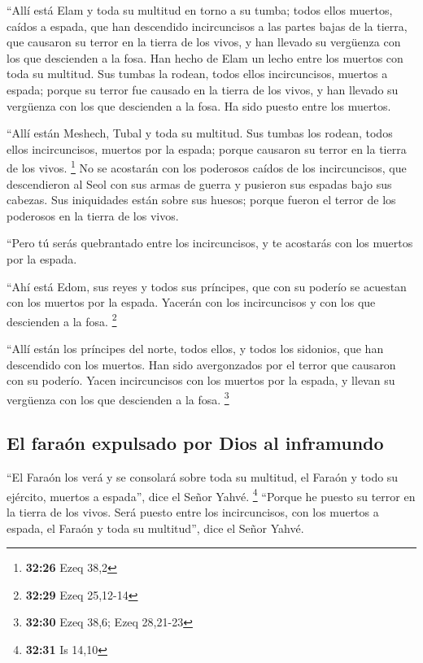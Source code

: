 \begin{paracol}{2}
 ``Allí está Elam y toda su multitud en torno a su tumba;
todos ellos muertos, caídos a espada, que han descendido incircuncisos a
las partes bajas de la tierra, que causaron su terror en la tierra de
los vivos, y han llevado su vergüenza con los que descienden a la fosa.
 Han hecho de Elam un lecho entre los muertos con toda su
multitud. Sus tumbas la rodean, todos ellos incircuncisos, muertos a
espada; porque su terror fue causado en la tierra de los vivos, y han
llevado su vergüenza con los que descienden a la fosa. Ha sido puesto
entre los muertos.

 ``Allí están Meshech, Tubal y toda su multitud. Sus
tumbas los rodean, todos ellos incircuncisos, muertos por la espada;
porque causaron su terror en la tierra de los vivos. \footnote{\textbf{32:26}
  Ezeq 38,2}  No se acostarán con los poderosos caídos de
los incircuncisos, que descendieron al Seol con sus armas de guerra y
pusieron sus espadas bajo sus cabezas. Sus iniquidades están sobre sus
huesos; porque fueron el terror de los poderosos en la tierra de los
vivos.

 ``Pero tú serás quebrantado entre los incircuncisos, y
te acostarás con los muertos por la espada.

 ``Ahí está Edom, sus reyes y todos sus príncipes, que
con su poderío se acuestan con los muertos por la espada. Yacerán con
los incircuncisos y con los que descienden a la fosa. \footnote{\textbf{32:29}
  Ezeq 25,12-14}

 ``Allí están los príncipes del norte, todos ellos, y
todos los sidonios, que han descendido con los muertos. Han sido
avergonzados por el terror que causaron con su poderío. Yacen
incircuncisos con los muertos por la espada, y llevan su vergüenza con
los que descienden a la fosa. \footnote{\textbf{32:30} Ezeq 38,6; Ezeq
  28,21-23}

\hypertarget{el-farauxf3n-expulsado-por-dios-al-inframundo}{%
\subsection{El faraón expulsado por Dios al
inframundo}\label{el-farauxf3n-expulsado-por-dios-al-inframundo}}

 ``El Faraón los verá y se consolará sobre toda su
multitud, el Faraón y todo su ejército, muertos a espada'', dice el
Señor Yahvé. \footnote{\textbf{32:31} Is 14,10}  ``Porque
he puesto su terror en la tierra de los vivos. Será puesto entre los
incircuncisos, con los muertos a espada, el Faraón y toda su multitud'',
dice el Señor Yahvé.


\end{paracol}
